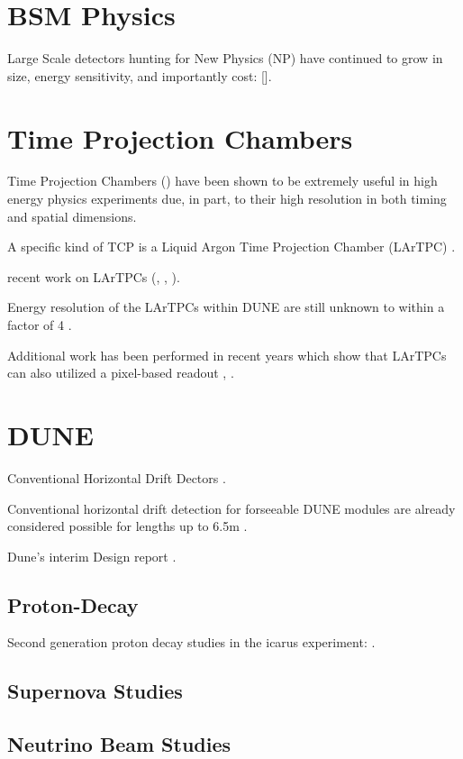 
\section{BSM Physics}

Large Scale detectors hunting for New Physics (NP) have continued to grow in size, energy sensitivity, and importantly cost: [\citep{Juno:2022103927}].

\section{Time Projection Chambers}

Time Projection Chambers (\citep{lartpc:nygren}) have been shown to be extremely useful in high energy physics experiments due, in part, to their high resolution in both timing and spatial dimensions.

A specific kind of TCP is a Liquid Argon Time Projection Chamber (LArTPC) \citep{rubbia1977liquid}.

recent work on LArTPCs (\citep{ArgoNeuT:PhysRevD.99.012002}, \citep{MicroBooNE:Acciarri_2017}, \citep{LArIAT:Acciarri_2020}).

Energy resolution of the LArTPCs within DUNE are still unknown to within a factor of 4 \citep{lartpc_energy_resolution:PhysRevD.99.036009}.

Additional work has been performed in recent years which show that LArTPCs can also utilized a pixel-based readout \citep{larpix:Dwyer_2018}, \citep{Asaadi_2018}.

\section{DUNE}

Conventional Horizontal Drift Dectors \citep{DUNE-FD:Abi_2020}.

Conventional horizontal drift detection for forseeable DUNE modules are already considered possible for lengths up to 6.5m \citep{DUNE_Vertical:Paulucci_2022}.

Dune's interim Design report \citep{DUNE_FD_TDR_2020}.



\subsection{Proton-Decay}

Second generation proton decay studies in the icarus experiment: \citep{ICARUS_2001}.

\subsection{Supernova Studies}

\subsection{Neutrino Beam Studies}